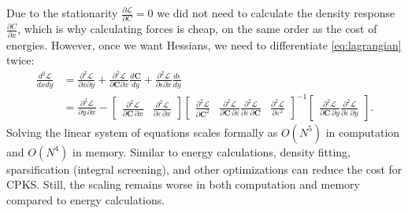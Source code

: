 \documentclass[pdflatex,sn-mathphys-num]{sn-jnl}%
\begin{document}
Due to the stationarity $\frac{\partial \mathcal{L}}{\partial C} = 0$ we did not need to calculate the density response $\frac{\partial C}{\partial x}$, which is why calculating forces is cheap, on the same order as the cost of energies. However, once we want Hessians, we need to differentiate \eqref{eq:lagrangian} twice:
\begin{align}
    \frac{d^2 \mathcal{L}}{dx dy} &= \frac{\partial^2 \mathcal{L}}{\partial x \partial y} + \frac{\partial^2 \mathcal{L}}{\partial \mathbf{C} \partial x} \frac{d \mathbf{C}}{d y} + \frac{\partial^2 \mathcal{L}}{\partial \epsilon \partial x}\frac{d \epsilon}{dy} \\
    &=  \frac{\partial^2 \mathcal L}{\partial y\,\partial x}
-\begin{bmatrix}
\displaystyle \frac{\partial^2 \mathcal L}{\partial \mathbf{C}\,\partial x} &
\displaystyle \frac{\partial^2 \mathcal L}{\partial \varepsilon\,\partial x}
\end{bmatrix}
\begin{bmatrix}
\displaystyle \frac{\partial^2 \mathcal L}{\partial \mathbf{C}^2} & \displaystyle \frac{\partial^2 \mathcal L}{\partial \mathbf{C}\,\partial \varepsilon} 
\displaystyle \frac{\partial^2 \mathcal L}{\partial \varepsilon\,\partial \mathbf{C}} & \displaystyle \frac{\partial^2 \mathcal L}{\partial \varepsilon^2}
\end{bmatrix}^{-1}
\begin{bmatrix}
\displaystyle \frac{\partial^2 \mathcal L}{\partial \mathbf{C}\,\partial y} 
\displaystyle \frac{\partial^2 \mathcal L}{\partial \varepsilon\,\partial y}
\end{bmatrix}.
\end{align}
Solving the linear system of equations scales formally as $O(N^5)$ in computation and $O(N^4)$ in memory. Similar to energy calculations, density fitting, sparsification (integral screening), and other optimizations can reduce the cost for CPKS. Still, the scaling remains worse in both computation and memory compared to energy calculations. 
\end{document}
